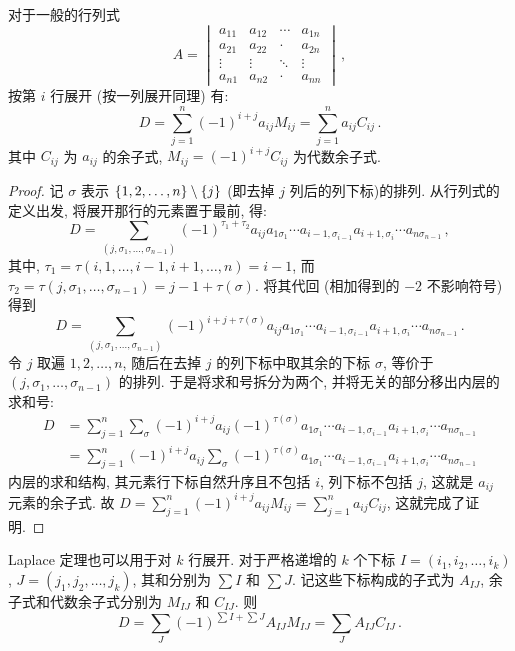 \documentclass[UTF8]{ctexart}
\DeclarePairedDelimiter\set{\lbrace}{\rbrace}
\begin{document}
对于一般的行列式
\[ 
    A = \begin{vmatrix}
    a_{11} & a_{12} & \cdots & a_{1n} \\
    a_{21} & a_{22} & \cdot & a_{2n} \\
    \vdots & \vdots & \ddots & \vdots \\
    a_{n1} & a_{n2} & \cdot & a_{nn}
    \end{vmatrix} \,,
\]
按第 $ i $ 行展开 (按一列展开同理) 有:
\[ 
    D = \sum_{j=1}^{n} (-1)^{i+j} a_{ij} M_{ij} = \sum_{j=1}^{n} a_{ij} C_{ij} \,.
\]
其中 $ C_{ij} $ 为 $ a_{ij} $ 的余子式, $ M_{ij} = (-1)^{i+j} C_{ij} $ 为代数余子式.

\begin{proof}
    记 $ \sigma $ 表示 $ \set{1, 2, \dots, n} \setminus \set{j} $ (即去掉 $ j $ 列后的列下标)的排列. 从行列式的定义出发, 将展开那行的元素置于最前, 得:
    \[ 
        D = \sum_{(j, \sigma_1, \dots, \sigma_{n-1})} (-1)^{\tau_1 + \tau_2} a_{ij} a_{1 \sigma_1} \cdots a_{i-1, \sigma_{i-1}} a_{i+1, \sigma_i} \cdots a_{n \sigma_{n-1}} \,,
    \]
    其中, $ \tau_1 = \tau(i, 1, \dots, i-1, i+1, \dots, n) = i - 1 $, 而 $ \tau_2 = \tau(j, \sigma_1, \dots, \sigma_{n-1}) = j - 1 + \tau(\sigma) $. 将其代回 (相加得到的 $ -2 $ 不影响符号) 得到
    \[ 
        D = \sum_{(j, \sigma_1, \dots, \sigma_{n-1})} (-1)^{i + j + \tau(\sigma)} a_{ij} a_{1 \sigma_1} \cdots a_{i-1, \sigma_{i-1}} a_{i+1, \sigma_i} \cdots a_{n \sigma_{n-1}} \,.
    \]
    令 $ j $ 取遍 $ 1, 2, \dots, n $, 随后在去掉 $ j $ 的列下标中取其余的下标 $ \sigma $, 等价于 $ (j, \sigma_1, \dots, \sigma_{n-1}) $ 的排列. 于是将求和号拆分为两个, 并将无关的部分移出内层的求和号:
    \begin{align*}
        D &= \sum_{j=1}^{n} \sum_{\sigma} (-1)^{i+j} a_{ij} (-1)^{\tau(\sigma)} a_{1 \sigma_1} \cdots a_{i-1, \sigma_{i-1}} a_{i+1, \sigma_i} \cdots a_{n \sigma_{n-1}} \\
        &= \sum_{j=1}^{n} (-1)^{i+j} a_{ij} \sum_{\sigma}  (-1)^{\tau(\sigma)} a_{1 \sigma_1} \cdots a_{i-1, \sigma_{i-1}} a_{i+1, \sigma_i} \cdots a_{n \sigma_{n-1}}
    \end{align*}
    内层的求和结构, 其元素行下标自然升序且不包括 $ i $, 列下标不包括 $ j $, 这就是 $ a_{ij} $ 元素的余子式. 故 $ D = \sum_{j=1}^{n} (-1)^{i+j} a_{ij} M_{ij} = \sum_{j=1}^{n} a_{ij} C_{ij} $, 这就完成了证明.
\end{proof}

Laplace 定理也可以用于对 $ k $ 行展开. 对于严格递增的 $ k $ 个下标 $ I = (i_1, i_2, \dots, i_k) $, $ J = (j_1, j_2, \dots, j_k) $, 其和分别为 $ \sum I $ 和 $ \sum J $. 记这些下标构成的子式为 $ A_{IJ} $, 余子式和代数余子式分别为 $ M_{IJ} $ 和 $ C_{IJ} $. 则
\[ 
    D = \sum_{J} (-1)^{\sum I + \sum J} A_{IJ} M_{IJ} = \sum_{J} A_{IJ} C_{IJ} \,.
\]
\end{document}
